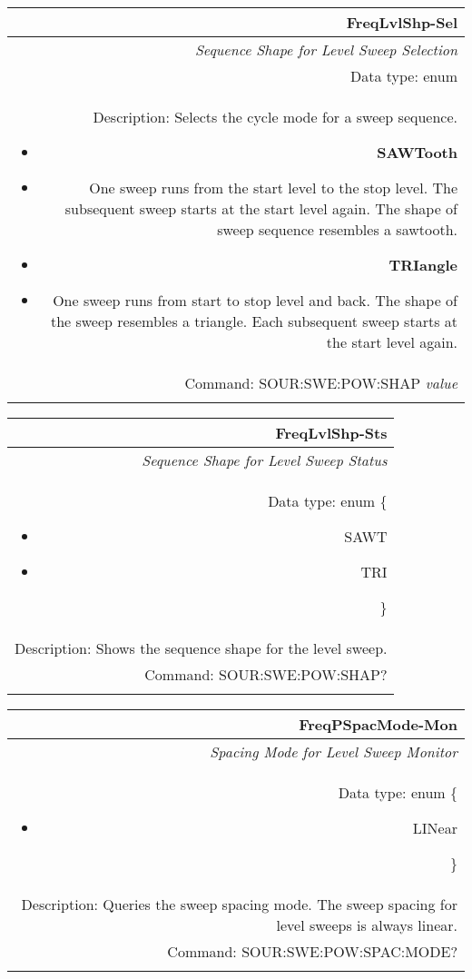 \documentclass[openany]{article}
\begin{document}
		\begin{tabular}{N}
			\hline
			\bfseries FreqLvlShp-Sel \\ \hline
			\emph{Sequence Shape for Level Sweep Selection} \\
			Data type: enum \\
			Description: Selects the cycle mode for a sweep sequence.\begin{itemize}[noitemsep]
				\small
				\item[] \textbf{SAWTooth} 
				\item[] One sweep runs from the start level to the stop level. The subsequent sweep starts at the start level again. The shape of sweep sequence resembles a sawtooth.
				\item[] \textbf{TRIangle}
				\item[] One sweep runs from start to stop level and back. The shape of the sweep resembles a triangle. Each subsequent sweep starts at the start level again.			
			\end{itemize} \\
			Command: SOUR:SWE:POW:SHAP \emph{value} \\
			\\

		\end{tabular}


		\begin{tabular}{N}
			\hline
			\bfseries FreqLvlShp-Sts \\ \hline
			\emph{Sequence Shape for Level Sweep Status} \\
			Data type: enum \{\begin{itemize}[noitemsep]
				\small
				\item[] SAWT
				\item[] TRI
			\end{itemize}\} \\ 
			Description: Shows the sequence shape for the level sweep. \\
			Command: SOUR:SWE:POW:SHAP? \\
			\\

		\end{tabular}


		\begin{tabular}{N}
			\hline
			\bfseries FreqPSpacMode-Mon \\ \hline
			\emph{Spacing Mode for Level Sweep Monitor} \\
			Data type: enum \{\begin{itemize}[noitemsep]
				\small
				\item[] LINear
			\end{itemize}\} \\
			Description: Queries the sweep spacing mode. The sweep spacing for level sweeps is always linear. \\
			Command: SOUR:SWE:POW:SPAC:MODE? \\
			\\
			
		\end{tabular}
\end{document}
